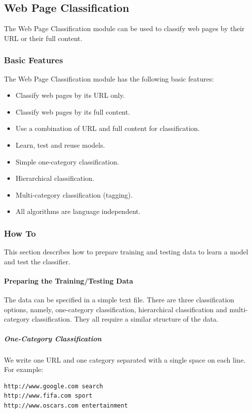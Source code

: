 \documentclass[a4paper,twoside]{article}      %
\begin{document}
\subsection{Web Page Classification}
The Web Page Classification module can be used to classify web pages by their URL or their full content.

\subsubsection{Basic Features}
The Web Page Classification module has the following basic features:
\begin{itemize}
\item Classify web pages by its URL only.
\item Classify web pages by its full content.
\item Use a combination of URL and full content for classification.
\item Learn, test and reuse models.
\item Simple one-category classification.
\item Hierarchical classification.
\item Multi-category classification (tagging).
\item All algorithms are language independent.
\end{itemize}

\subsubsection{How To}
This section describes how to prepare training and testing data to learn a model and test the classifier.

\paragraph{Preparing the Training/Testing Data}
The data can be specified in a simple text file. There are three classification options, namely, one-category classification, hierarchical classification and multi-category classification. They all require a similar structure of the data.

\subparagraph{One-Category Classification}
We write one URL and one category separated with a single space on each line. For example:
\begin{verbatim}
http://www.google.com search
http://www.fifa.com sport
http://www.oscars.com entertainment
\end{verbatim}
\end{document}
